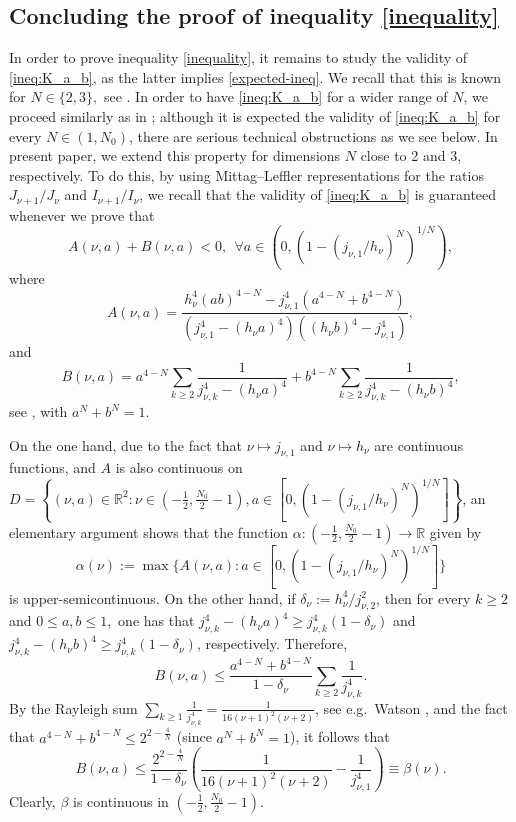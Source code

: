 \documentclass[11pt, reqno]{amsart}
\numberwithin{equation}{section}
\begin{document}
	\subsection{Concluding the proof of inequality \eqref{inequality}}	 In order to prove inequality \eqref{inequality}, it remains to study the validity of \eqref{ineq:K_a_b}, as the latter implies \eqref{expected-ineq}. We recall that this is known for $N\in \{2,3\},$ see \cite[Appendix 1]{A-B-Duke}.  In order to have \eqref{ineq:K_a_b} for a wider range of $N$, we proceed similarly as in \cite{A-B-Duke}; although it is expected the validity of \eqref{ineq:K_a_b} for every $N\in (1,N_0)$, there are serious technical obstructions as we see below. In present paper, we extend this property for dimensions $N$ close to 2 and 3, respectively. To do this,  by using Mittag--Leffler representations for the ratios  $J_{\nu+1}/J_\nu$ and $I_{\nu+1}/I_\nu$, we recall that the validity of \eqref{ineq:K_a_b} is guaranteed whenever we prove that 
		 \begin{equation}\label{A-B-nu}
		 A(\nu,a) + B(\nu,a)<0,\ \ \forall a\in (0,(1-(j_{\nu,1}/h_\nu)^N)^{1/N}),
		 \end{equation}
		  where 
		  \begin{equation}\label{A-nu}
		  	A(\nu,a)=\frac{h_\nu^4(ab)^{4-N}-j_{\nu,1}^4(a^{4-N}+b^{4-N})}{(j_{\nu,1}^4-(h_\nu a)^4)((h_\nu b)^4-j_{\nu,1}^4)},
		  \end{equation}
		and 
	 \begin{equation}\label{B-nu}
		B(\nu,a)=a^{4-N}\sum_{k\geq 2}\frac{1}{j_{\nu,k}^4-(h_\nu a)^4}+b^{4-N}\sum_{k\geq 2}\frac{1}{j_{\nu,k}^4-(h_\nu b)^4},
	\end{equation}
see \cite[rels.\ (45)\&(46)]{A-B-Duke}, with $a^N+b^N=1$. 

On the one hand, due to the fact that $\nu\mapsto j_{\nu,1}$ and $\nu\mapsto h_\nu$ are continuous functions, and $A$ is also continuous on $D=\left\{(\nu,a)\in \mathbb R^2: \nu\in (-\frac{1}{2},\frac{N_0}{2}-1),a\in [0,(1-(j_{\nu,1}/h_\nu)^N)^{1/N}]\right\}$,  an elementary argument shows that the function $\alpha:(-\frac{1}{2},\frac{N_0}{2}-1)\to \mathbb R$ given by 
$$\alpha(\nu):=\max \{A(\nu,a):a\in [0,(1-(j_{\nu,1}/h_\nu)^N)^{1/N}]\}$$
is upper-semicontinuous. 
On the other hand, if $\delta_\nu:=h_\nu^4/j_{\nu,2}^2$, then for every $k\geq 2$ and $0\leq a,b\leq 1,$ one has that $j_{\nu,k}^4-(h_\nu a)^4\geq j_{\nu,k}^4(1-\delta_\nu)$ and  $j_{\nu,k}^4-(h_\nu b)^4\geq j_{\nu,k}^4(1-\delta_\nu)$, respectively. Therefore, 
$$B(\nu,a)\leq \frac{a^{4-N}+b^{4-N}}{1-\delta_\nu}\sum_{k\geq 2}\frac{1}{j_{\nu,k}^4}.$$ 
By the Rayleigh sum $\sum_{k\geq 1}\frac{1}{j_{\nu,k}^4}=\frac{1}{16(\nu+1)^2(\nu+2)}$, see e.g.\ Watson \cite{Watson}, and the fact that $a^{4-N}+b^{4-N}\leq 2^{2-\frac{4}{N}}$ (since $a^N+b^N=1$), it follows that 
$$B(\nu,a)\leq \frac{2^{2-\frac{4}{N}}}{1-\delta_\nu}\left(\frac{1}{16(\nu+1)^2(\nu+2)}-\frac{1}{j_{\nu,1}^4}\right)\equiv \beta(\nu).$$
Clearly, $\beta$ is continuous in $(-\frac{1}{2},\frac{N_0}{2}-1)$. 		
\end{document}
